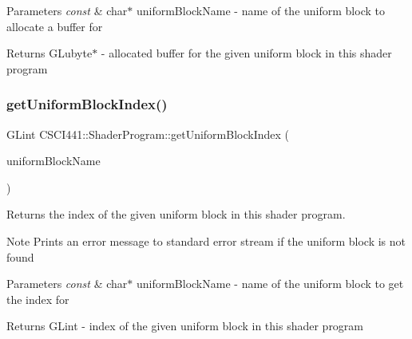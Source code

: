\begin{DoxyParams}{Parameters}
{\em const} & char$\ast$ uniform\+Block\+Name -\/ name of the uniform block to allocate a buffer for \\
\hline
\end{DoxyParams}
\begin{DoxyReturn}{Returns}
G\+Lubyte$\ast$ -\/ allocated buffer for the given uniform block in this shader program 
\end{DoxyReturn}
\mbox{\label{class_c_s_c_i441_1_1_shader_program_ab7e22eaa60f7ee098c8b9efc87de6397}} 
\subsubsection{\texorpdfstring{get\+Uniform\+Block\+Index()}{getUniformBlockIndex()}}
{\footnotesize\ttfamily G\+Lint C\+S\+C\+I441\+::\+Shader\+Program\+::get\+Uniform\+Block\+Index (\begin{DoxyParamCaption}\item[{const char $\ast$}]{uniform\+Block\+Name }\end{DoxyParamCaption})}



Returns the index of the given uniform block in this shader program. 

\begin{DoxyNote}{Note}
Prints an error message to standard error stream if the uniform block is not found 
\end{DoxyNote}

\begin{DoxyParams}{Parameters}
{\em const} & char$\ast$ uniform\+Block\+Name -\/ name of the uniform block to get the index for \\
\hline
\end{DoxyParams}
\begin{DoxyReturn}{Returns}
G\+Lint -\/ index of the given uniform block in this shader program 
\end{DoxyReturn}
\mbox{\label{class_c_s_c_i441_1_1_shader_program_a86f97ca91c4a86a59749d7470b7e20d9}} 
